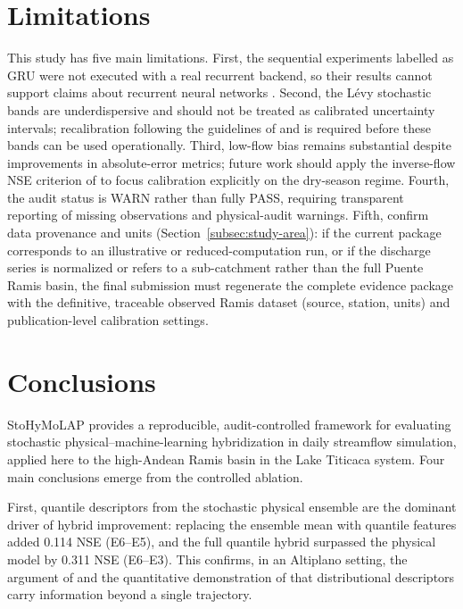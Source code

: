 \documentclass[a4paper,fleqn]{cas-sc}
\begin{document}
\section{Limitations}\label{sec:limitations}

This study has five main limitations. First, the sequential experiments
labelled as GRU were not executed with a real recurrent backend, so
their results cannot support claims about recurrent neural networks
\citep{kratzert2018rainfall}. Second, the L\'{e}vy stochastic bands are
underdispersive and should not be treated as calibrated uncertainty
intervals; recalibration following the guidelines of \citet{thiboult2016accounting}
and \citet{abaza2017incidence} is required before these bands can be used
operationally. Third, low-flow bias remains substantial despite
improvements in absolute-error metrics; future work should apply
the inverse-flow NSE criterion of \citet{pushpalatha2012review} to focus
calibration explicitly on the dry-season regime. Fourth, the audit
status is WARN rather than fully PASS, requiring transparent reporting
of missing observations and physical-audit warnings. Fifth, %
confirm data provenance and units (Section~\ref{subsec:study-area}):
if the current package corresponds to an illustrative or
reduced-computation run, or if the discharge series is normalized or
refers to a sub-catchment rather than the full Puente Ramis basin, the
final submission must regenerate the complete evidence package with the
definitive, traceable observed Ramis dataset (source, station, units)
and publication-level calibration settings.

\section{Conclusions}\label{sec:conclusions}

StoHyMoLAP provides a reproducible, audit-controlled framework for
evaluating stochastic physical--machine-learning hybridization in daily
streamflow simulation, applied here to the high-Andean Ramis basin in
the Lake Titicaca system. Four main conclusions emerge from the
controlled ablation.

First, quantile descriptors from the stochastic physical ensemble are
the dominant driver of hybrid improvement: replacing the ensemble mean
with quantile features added 0.114 NSE (E6--E5), and the full
quantile hybrid surpassed the physical model by 0.311 NSE (E6--E3).
This confirms, in an Altiplano setting, the argument of
\citet{papacharalampous2022review} and the quantitative demonstration of
\citet{houenafa2025hybridization} that distributional descriptors carry information
beyond a single trajectory.
\end{document}
